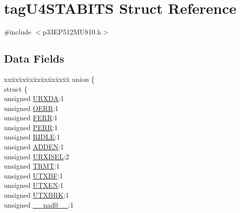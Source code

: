 \hypertarget{structtag_u4_s_t_a_b_i_t_s}{}\section{tag\+U4\+S\+T\+A\+B\+I\+TS Struct Reference}
\label{structtag_u4_s_t_a_b_i_t_s}


{\ttfamily \#include $<$p33\+E\+P512\+M\+U810.\+h$>$}

\subsection*{Data Fields}
\begin{DoxyCompactItemize}
\item 
\begin{tabbing}
xx\=xx\=xx\=xx\=xx\=xx\=xx\=xx\=xx\=\kill
union \{\\
\>struct \{\\
\>\>unsigned \hyperlink{structtag_u4_s_t_a_b_i_t_s_afe0995f70524f97d3bbf5a19da8be125}{URXDA}:1\\
\>\>unsigned \hyperlink{structtag_u4_s_t_a_b_i_t_s_a51850c0a0e36c88695788d8258825fb1}{OERR}:1\\
\>\>unsigned \hyperlink{structtag_u4_s_t_a_b_i_t_s_a6e9c49ea6356906ea25431c922eb7c71}{FERR}:1\\
\>\>unsigned \hyperlink{structtag_u4_s_t_a_b_i_t_s_a5223bc48d63e95d58e42b4cdd2edbf26}{PERR}:1\\
\>\>unsigned \hyperlink{structtag_u4_s_t_a_b_i_t_s_a8016ed1f9d9355d999bd0b5acfce06da}{RIDLE}:1\\
\>\>unsigned \hyperlink{structtag_u4_s_t_a_b_i_t_s_aa4d6c69beac6d542ad6bc014875fdff2}{ADDEN}:1\\
\>\>unsigned \hyperlink{structtag_u4_s_t_a_b_i_t_s_a8d6af72bfcd1f23f63ace4f6e89dfcdf}{URXISEL}:2\\
\>\>unsigned \hyperlink{structtag_u4_s_t_a_b_i_t_s_a63ff36fd0aa1645fb63d427eb941f177}{TRMT}:1\\
\>\>unsigned \hyperlink{structtag_u4_s_t_a_b_i_t_s_ae6f14589464b1e04ff7734553772427e}{UTXBF}:1\\
\>\>unsigned \hyperlink{structtag_u4_s_t_a_b_i_t_s_aa6ca11f821bfebd67e7001d212fbceea}{UTXEN}:1\\
\>\>unsigned \hyperlink{structtag_u4_s_t_a_b_i_t_s_a5e99a7959107d3aa21958bad8ee4bc6e}{UTXBRK}:1\\
\>\>unsigned \hyperlink{structtag_u4_s_t_a_b_i_t_s_adf71f3d8410c1f1dbbc96680a92c49af}{\_\_pad0\_\_}:1\\

\end{tabbing}
\end{DoxyCompactItemize}
